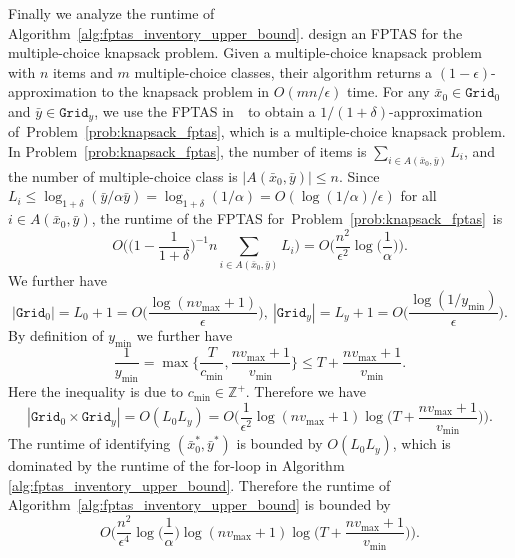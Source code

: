 \documentclass[mnsc,non-blindrev]{informs3}
\theoremstyle{definition}
\begin{document}
\begin{appendices}{\Large{}}
Finally we analyze the runtime of Algorithm~\ref{alg:fptas_inventory_upper_bound}. \cite{bansal2004improved} design an FPTAS for the multiple-choice knapsack problem. Given a multiple-choice knapsack problem with $n$ items and $m$ multiple-choice classes, their algorithm returns a $(1-\epsilon)$-approximation to the knapsack problem in $O(mn/\epsilon)$ time. For any $\bar{x}_0\in\texttt{Grid}_0$ and $\bar{y}\in\texttt{Grid}_y$, we use the FPTAS in~\cite{bansal2004improved}~to obtain a $1/(1+\delta)$-approximation of~Problem~\eqref{prob:knapsack_fptas}, which is a multiple-choice knapsack problem. In Problem~\eqref{prob:knapsack_fptas}, the number of items is $\sum_{i\in A(\bar{x}_0,\bar{y})} L_i$, and the number of multiple-choice class is $|A(\bar{x}_0,\bar{y})|\leq n$. Since $L_i\leq \log_{1+\delta}(\bar{y}/\alpha\bar{y})=\log_{1+\delta}(1/\alpha)=O(\log(1/\alpha)/\epsilon)$ for all $i\in A(\bar{x}_0,\bar{y})$, the runtime of the FPTAS for~Problem~\eqref{prob:knapsack_fptas}~is
\begin{equation*}
O\Big(\Big(1-\dfrac{1}{1+\delta}\Big)^{  -1}n\sum_{i\in A(\bar{x}_0,\bar{y})}L_i\Big)=O\Big(\dfrac{n^2}{\epsilon^2}\log\Big(\dfrac{1}{\alpha}\Big)\Big).
\end{equation*}
We further have
\begin{equation*}
|\texttt{Grid}_0|=L_0+1=O\Big(\dfrac{\log(nv_{\max}+1)}{\epsilon}\Big),\ |\texttt{Grid}_y|=L_y+1=O\Big(\dfrac{\log(1/y_{\min})}{\epsilon}\Big).
\end{equation*}
By definition of $y_{\min}$ we further have
\begin{equation*}
\dfrac{1}{y_{\min}}=\max\Big\{\dfrac{T}{c_{\min}},\dfrac{nv_{\max}+1}{v_{\min}}\Big\}\leq T+\dfrac{nv_{\max}+1}{v_{\min}}.
\end{equation*}
Here the inequality is due to $c_{\min}\in\mathbb{Z}^+$. Therefore we have
\begin{equation*}
|\texttt{Grid}_0\times \texttt{Grid}_y|=O(L_0L_y)=O\Big(\dfrac{1}{\epsilon^2}\log(nv_{\max}+1)\log\Big(T+\dfrac{nv_{\max}+1}{v_{\min}}\Big)\Big).
\end{equation*}
The runtime of identifying $(\bar{x}_0^*,\bar{y}^*)$ is bounded by $O(L_0L_y)$, which is dominated by the runtime of the for-loop in Algorithm \ref{alg:fptas_inventory_upper_bound}. Therefore the runtime of Algorithm~\ref{alg:fptas_inventory_upper_bound} is bounded by
\begin{equation*}
O\Big(\dfrac{n^2}{\epsilon^4}\log\Big(\dfrac{1}{\alpha}\Big)\log(nv_{\max}+1)\log\Big(T+\dfrac{nv_{\max}+1}{v_{\min}}\Big)\Big).
\end{equation*}


\end{appendices}
\end{document}
